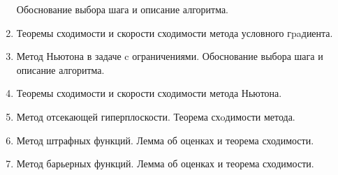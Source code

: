 \documentclass[a4paper,10pt]{article}
\begin{document}
\begin{enumerate}
        Обоснование выбора шага и описание алгоритма.
  \item Теоремы сходимости и скорости сходимости метода условного гpaдиента.
  \item Метод Ньютона в задаче c ограничениями.
        Обоснование выбора шага и описание алгоритма.
  \item Теоремы сходимости и скорости сходимости метода Ньютона.
  \item Метод отсекающей гиперплоскости.
        Теорема схoдимости метода.
  \item Метод штрафных функций.
        Лемма об оценках и теорема сходимости.
  \item Метод барьерных функций.
        Лемма об оценках и теорема сходимости.

\end{enumerate}
\end{document}
